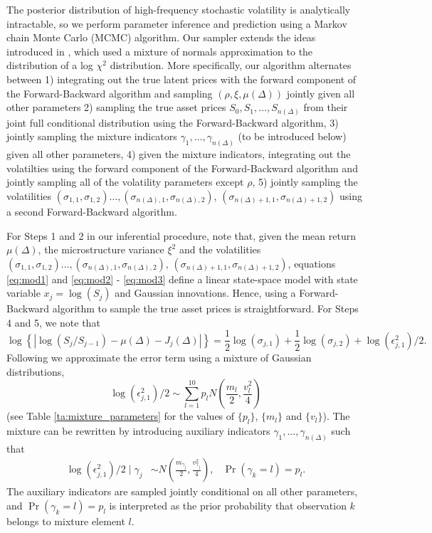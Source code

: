 The posterior distribution of high-frequency stochastic volatility is analytically intractable, so we perform parameter inference and prediction using a Markov chain Monte Carlo (MCMC) algorithm.  Our sampler extends the ideas introduced in \cite{omori2007stochastic}, which used a mixture of normals approximation to the distribution of a log $\chi^2$ distribution.  More specifically, our algorithm alternates between 1) integrating out the true latent prices with the forward component of the Forward-Backward algorithm \cite{carter1994gibbs,fruhwirth1994data} and sampling $(\rho, \xi, \mu(\Delta))$ jointly given all other parameters 2) sampling the true asset prices $S_0, S_1, \ldots, S_{n(\Delta)}$ from their joint full conditional distribution using the Forward-Backward algorithm, 3) jointly sampling the mixture indicators $\gamma_1, \ldots, \gamma_{n(\Delta)}$ (to be introduced below) given all other parameters, 4) given the mixture indicators, integrating out the volatilties using the forward component of the Forward-Backward algorithm and jointly sampling all of the volatility parameters except $\rho$, 5) jointly sampling the volatilities $(\sigma_{1,1},\sigma_{1,2}) \ldots, (\sigma_{n(\Delta),1}, \sigma_{n(\Delta),2})$, $(\sigma_{n(\Delta) + 1,1}, \sigma_{n(\Delta) + 1,2})$ using a second Forward-Backward algorithm.

For Steps 1 and 2 in our inferential procedure, note that, given the mean return $\mu(\Delta)$, the microstructure variance $\xi^2$ and the volatilities $(\sigma_{1,1},\sigma_{1,2}) \ldots, (\sigma_{n(\Delta),1}, \sigma_{n(\Delta),2})$, $(\sigma_{n(\Delta) + 1,1}, \sigma_{n(\Delta) + 1,2})$, equations \eqref{eq:mod1} and \eqref{eq:mod2} - \eqref{eq:mod3} define a linear state-space model with state variable $x_j = \log (S_j)$ and Gaussian innovations.  Hence, using a Forward-Backward algorithm to sample the true asset prices is straightforward.  For Steps 4 and 5, we note that
\[
\log\left\{ | \log(S_j / S_{j -1}) - \mu(\Delta) - J_j(\Delta) | \right\} = \frac{1}{2}\log(\sigma_{j,1}) + \frac{1}{2}\log(\sigma_{j,2}) + \log( \epsilon^2_{j,1} )/2 .
\]
Following \cite{omori2007stochastic} we approximate the error term using a mixture of Gaussian distributions,
$$
\log( \epsilon^2_{j,1} )/2 \sim \sum_{l=1}^{10} p_l N \left( \frac{m_l}{2}, \frac{v_l^2}{4} \right)
$$
(see Table \ref{ta:mixture_parameters} for the values of $\{ p_l \}$, $\{ m_l \}$ and $\{ v_l \}$).  The mixture can be rewritten by introducing auxiliary indicators $\gamma_1, \ldots, \gamma_{n(\Delta)}$ such that
\begin{align*}
\log( \epsilon^2_{j,1} )/2 \mid \gamma_j &\sim N \left( \frac{m_{\gamma_j}}{2}, \frac{v_{\gamma_j}^2}{4} \right)   ,   &   \Pr(\gamma_k = l) = p_l .
\end{align*}
The auxiliary indicators are sampled jointly conditional on all other parameters, and $\Pr(\gamma_k = l) = p_l$ is interpreted as the prior probability that observation $k$ belongs to mixture element $l$.

